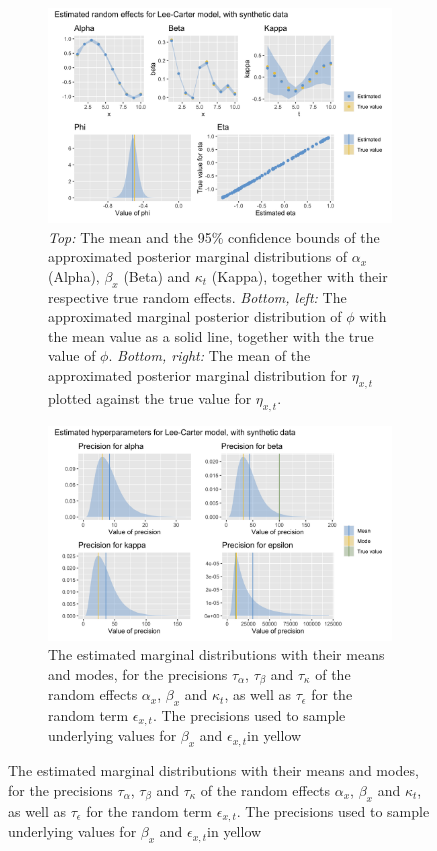 \begin{figure}[h!]
    \centering
    \begin{subfigure}[b]{0.85\textwidth}
        \centering
        \includegraphics[width=\textwidth]{synthetic-data/Figures/effects-LC-synthetic.png}
        \caption{\textit{Top:} The mean and the 95\% confidence bounds of the approximated posterior marginal distributions of $\alpha_x$ (Alpha), $\beta_x$ (Beta) and $\kappa_t$ (Kappa), together with their respective true random effects. \textit{Bottom, left:} The approximated marginal posterior distribution of $\phi$ with the mean value as a solid line, together with the true value of $\phi$. \textit{Bottom, right:} The mean of the approximated posterior marginal distribution for $\eta_{x,t}$ plotted against the true value for $\eta_{x,t}$. }
        \label{fig:firstRun-top}
    \end{subfigure}
    
    \begin{subfigure}[b]{0.6\textwidth}
        \centering
        \includegraphics[width=\textwidth]{synthetic-data/Figures/hyperparameters-LC-synthetic-2-1.png}
        \caption{The estimated marginal distributions with their means and modes, for the precisions $\tau_\alpha$, $\tau_\beta$ and $\tau_\kappa$ of the random effects $\alpha_x$, $\beta_x$ and $\kappa_t$, as well as $\tau_\epsilon$ for the random term $\epsilon_{x,t}$. The precisions used to sample underlying values for $\beta_x$ and $\epsilon_{x,t}$in yellow}
        \label{fig:firstRun-bottom}
    \end{subfigure}
    

\end{figure}
